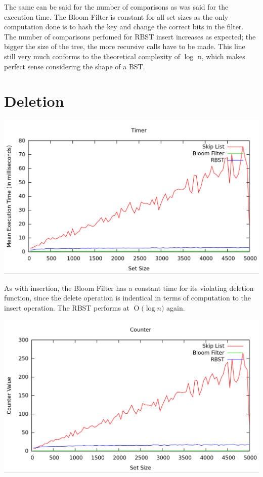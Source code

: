 \documentclass[11pt, notitlepage]{report}
\newcommand{\BigO}[1]{\ensuremath{\operatorname{O}\bigl(#1\bigr)}}
\begin{document}
The same can be said for the number of comparisons as was said for the execution time. The Bloom Filter is constant for all set sizes as the only computation done is to hash the key and change the correct bits in the filter.\\

The number of comparisons perfomed for RBST insert increases as expected; the bigger the size of the tree, the more recursive calls have to be made. This line still very much conforms to the theoretical complexity of $\log$ n, which makes perfect sense considering the shape of a BST.

\section*{Deletion}

\includegraphics[width=\linewidth]{img/Timer-Del}

As with insertion, the Bloom Filter has a constant time for its violating deletion function, since the delete operation is indentical in terms of computation to the insert operation. The RBST performs at \BigO{\log n} again.

\includegraphics[width=\linewidth]{img/Counter-Del}
\end{document}
